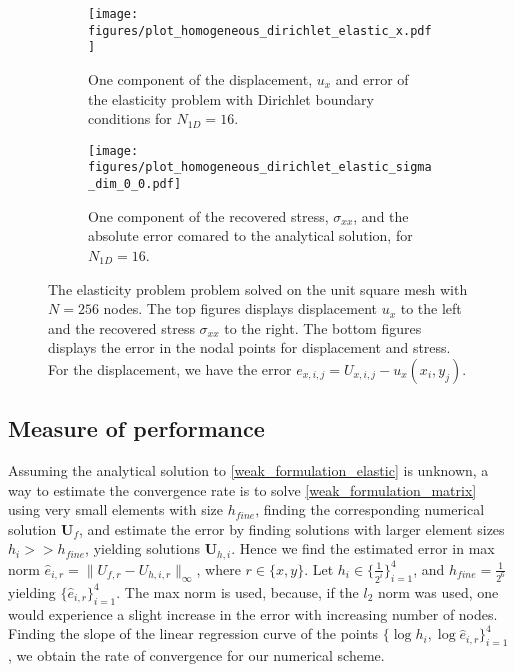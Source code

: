 \documentclass[5pt,a4paper,english]{elsarticle}%
\begin{document}
\begin{figure}[ht]   
    \begin{subfigure}[b]{0.5\textwidth}
        \centering
            \texttt{[image: figures/plot\_homogeneous\_dirichlet\_elastic\_x.pdf]}
            \caption{One component of the displacement, $u_x$ and error of the elasticity problem with Dirichlet boundary conditions for $N_{1D} = 16$.}
        \label{solution-error-dirichlet-elastic-x}
    \end{subfigure}\qquad
    \begin{subfigure}[b]{0.5\textwidth}
        \centering
            \texttt{[image: figures/plot\_homogeneous\_dirichlet\_elastic\_sigma\_dim\_0\_0.pdf]}
            \caption{One component of the recovered stress, $\sigma_{xx}$, and the absolute error comared to the analytical solution, for $N_{1D} = 16$.}
        \label{solution-error-dirichlet-elastic-sigma-xx}
    \end{subfigure}

    \caption{The elasticity problem problem solved on the unit square mesh with $N = 256$ nodes. The top figures displays displacement $u_x$ to the left and the recovered stress $\sigma_{xx}$ to the right. The bottom figures displays the error in the nodal points for displacement and stress. For the displacement, we have the error $e_{x,i,j} = U_{x,i,j} - u_x(x_i,y_j)$.}
\end{figure}

\subsection*{Measure of performance}

Assuming the analytical solution to \eqref{weak_formulation_elastic} is unknown, a way to estimate the convergence rate is to solve \eqref{weak_formulation_matrix} using very small elements with size $h_{fine}$, finding the corresponding numerical solution $\bm U_f$, and estimate the error by finding solutions with larger element sizes $h_i >> h_{fine}$, yielding solutions $\bm U_{h,i}$. Hence we find the estimated error in max norm $\hat e_{i,r} = \|U_{f,r} - U_{h,i,r} \|_{\infty}$, where $r\in \{x,y\}$. Let $h_i \in \{\frac{1}{2^i}\}_{i=1}^4$, and $h_{fine} = \frac{1}{2^6}$ yielding $\{\hat e_{i,r}\}_{i=1}^4$. The max norm is used, because, if the $l_2$ norm was used, one would experience a slight increase in the error with increasing number of nodes. Finding the slope of the linear regression curve of the points $\{\log h_i,\log  \hat e_{i,r}\}_{i=1}^4$, we obtain the rate of convergence for our numerical scheme. 
\end{document}
